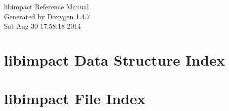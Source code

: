 \documentclass[letterpaper]{book}
\begin{document}
\begin{titlepage}
\vspace*{7cm}
\begin{center}
{\Large libimpact Reference Manual}\\
\vspace*{1cm}
{\large Generated by Doxygen 1.4.7}\\
\vspace*{0.5cm}
{\small Sat Aug 30 17:58:18 2014}\\
\end{center}
\end{titlepage}
\clearemptydoublepage
{}
\tableofcontents
\clearemptydoublepage
{}
\chapter{libimpact Data Structure Index}

\chapter{libimpact File Index}

\end{document}
